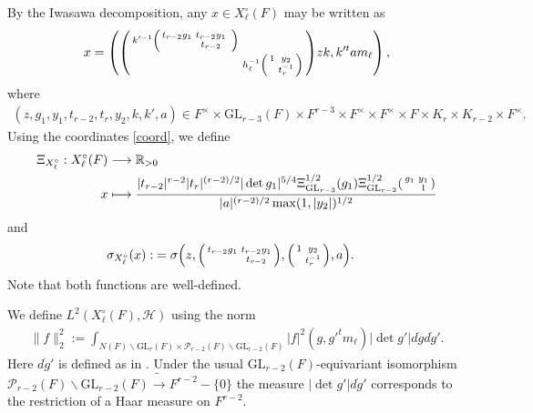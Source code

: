 \documentclass[12pt]{amsart}
\theoremstyle{remark}
\numberwithin{equation}{section}
\newcommand{\GL}{\mathrm{GL}}
\newcommand{\lto}{\longrightarrow}
\newcommand{\RR}{\mathbb{R}}
\theoremstyle{definition}
\newenvironment{psmatrix}
  {\left(\begin{smallmatrix}}
  {\end{smallmatrix}\right)}
\numberwithin{equation}{subsection}
\newcommand{\norm}[1]{\lVert#1\rVert}
\begin{document}
By the Iwasawa decomposition, any $x\in X_\ell^\circ(F)$  may be written as
\begin{align}\label{coord}
    x=\left(\begin{psmatrix}k'^{-1}\begin{psmatrix}t_{r-2}g_1 & t_{r-2}y_1&\\ & t_{r-2} \end{psmatrix}& \\ & h_\ell^{-1}\begin{psmatrix} 1 & y_2\\ & t_{r}^{-1}\end{psmatrix} \end{psmatrix}zk,k'^tam_\ell \right),
\end{align}
where
\begin{align*} 
(z,g_1,y_1,t_{r-2},t_r,y_2,k,k',a) \in  F^\times \times \GL_{r-3}(F) \times F^{r-3} \times F^\times \times F^\times \times F \times K_r \times K_{r-2} \times F^\times.
\end{align*} 
Using the coordinates \eqref{coord}, we define 
\begin{align}  \label{XiXP} \begin{split}
\Xi_{X_\ell^\circ}:X^\circ_\ell(F)  &\lto \RR_{>0}\\  x&\longmapsto \frac{|t_{r-2}|^{r-2}|t_r|^{(r-2)/2}|\det g_1|^{5/4}\Xi^{1/2}_{\GL_{r-3}}(g_1)\Xi_{\GL_{r-2}}^{1/2}\begin{psmatrix}
        g_1 &y_1 \\
          & 1
    \end{psmatrix}}{|a|^{(r-2)/2}\max(1,|y_2|)^{1/2}}\end{split}
\end{align}
and 
\begin{align} \label{sigX} \begin{split}
\sigma_{X_\ell^\circ}(x):&=\sigma\Big(z,\begin{psmatrix}t_{r-2}g_1 & t_{r-2}y_1\\ & t_{r-2} \end{psmatrix},\begin{psmatrix} 1 & y_2 \\& t_{r}^{-1}\end{psmatrix},a\Big).
\end{split}
\end{align} 
Note that both functions are well-defined.


We define $L^2(X_{\ell}^\circ(F),\mathcal{H})$ using the norm
\begin{align*} 
\norm{f}_2^2:=\int_{N(F) \backslash \GL_r(F) \times \mathcal{P}_{r-2}(F) \backslash \GL_{r-2}(F)}|f|^2(g,g'^tm_{\ell}) |\det g'|d\dot{g}d\dot{g}'.
\end{align*}
Here $d\dot{g}'$ is defined as in \cite[\S 2.5]{BP:GLn}.  Under the usual $\GL_{r-2}(F)$-equivariant isomorphism $\mathcal{P}_{r-2}(F) \backslash \GL_{r-2}(F)\tilde{\to} F^{r-2}-\{0\}$ the measure $|\det g'|d\dot{g}'$ corresponds to the restriction of a Haar measure on $F^{r-2}.$
\end{document}
